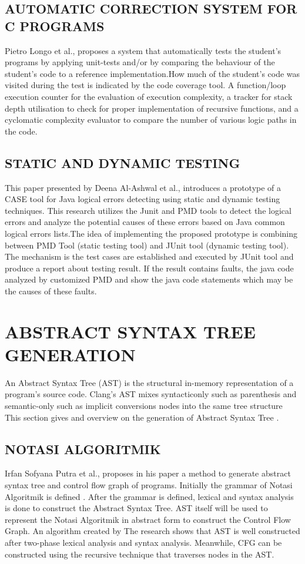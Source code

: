 \subsection{AUTOMATIC CORRECTION SYSTEM FOR C PROGRAMS}
Pietro Longo et al.,\cite{10.1007/978-3-642-04754-1_2} proposes a system that automatically tests the student’s programs by applying unit-tests and/or by comparing the behaviour of the student’s code to a reference implementation.How much of the student's code was visited during the test is indicated by the code coverage tool. A function/loop execution counter for the evaluation of execution complexity, a tracker for stack depth utilisation to check for proper implementation of recursive functions, and a cyclomatic complexity evaluator to compare the number of various logic paths in the code.

\subsection{STATIC AND DYNAMIC TESTING}
This paper presented by Deena Al-Ashwal et al.,\cite{8672669} introduces a prototype of a CASE
tool for Java logical errors detecting using static and dynamic
testing techniques. This research utilizes the Junit and PMD tools
to detect the logical errors and analyze the potential causes of
these errors based on Java common logical errors lists.The idea of implementing the proposed prototype is
combining between PMD Tool (static testing tool) and JUnit
tool (dynamic testing tool). The mechanism is  the test cases are established and executed by JUnit tool and produce a report about testing result. If the result contains
faults, the java code analyzed by customized PMD and show
the java code statements which may be the causes of these faults.
\section{\uppercase{ABSTRACT SYNTAX TREE GENERATION}}
An Abstract Syntax Tree (AST) is the structural in-memory representation of a program’s source code. Clang’s AST mixes syntacticonly such as parenthesis and semantic-only such as implicit conversions nodes into the same tree structure
This section gives and overview on the generation of Abstract Syntax Tree .
\subsection{ NOTASI ALGORITMIK}
Irfan Sofyana Putra et al.,\cite{9648437} proposes in his paper a method to generate abstract syntax tree and control flow graph of programs. Initially  the grammar of Notasi Algoritmik is defined . After the grammar is defined, lexical and syntax analysis is done to construct the Abstract Syntax Tree. AST itself will be used to represent the Notasi Algoritmik in abstract form to construct the Control Flow Graph. An algorithm created by  The research shows that AST is well constructed after two-phase lexical analysis and syntax
analysis. Meanwhile, CFG can be constructed using the recursive technique that traverses nodes in the AST.
